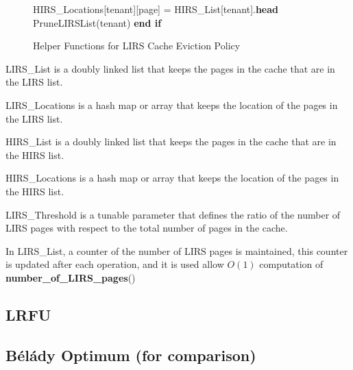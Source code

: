 \begin{figure}[htbp]
\begin{minipage}{\linewidth}
\begin{algorithm}[H]
\begin{algorithmic}
            \STATE \hspace{\algorithmicindent} \hspace{\algorithmicindent} HIRS\_Locations[tenant][page] = HIRS\_List[tenant].\textbf{head}
            \STATE \hspace{\algorithmicindent} \hspace{\algorithmicindent} PruneLIRSList(tenant)
            \STATE \hspace{\algorithmicindent} \textbf{end if}
        \end{algorithmic}
    \end{algorithm}
    \caption{Helper Functions for LIRS Cache Eviction Policy}
    \label{fig:lirs-helper}
    \end{minipage}
\end{figure}

LIRS\_List is a doubly linked list that keeps the pages in the cache that are in the LIRS list.

LIRS\_Locations is a hash map or array that keeps the location of the pages in the LIRS list.

HIRS\_List is a doubly linked list that keeps the pages in the cache that are in the HIRS list.

HIRS\_Locations is a hash map or array that keeps the location of the pages in the HIRS list.

LIRS\_Threshold is a tunable parameter that defines the ratio of the number of LIRS pages with 
respect to the total number of pages in the cache.

In LIRS\_List, a counter of the number of LIRS pages is maintained, this counter is updated after 
each operation, and it is used allow $O(1)$ computation of \textbf{number\_of\_LIRS\_pages}()

\subsection{LRFU}

\subsection{Bélády Optimum (for comparison)}